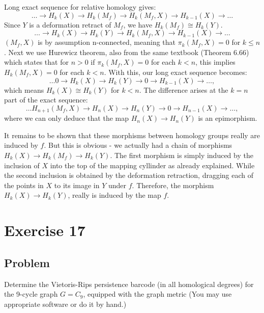 \documentclass{article}
\begin{document}
\noindent
Long exact sequence for relative homology gives:
\begin{equation*}
\dots \to H_k(X) \to H_k(M_f) \to H_k(M_f,X) \to H_{k-1}(X) \to \dots
\end{equation*}
Since $Y$ is a deformation retract of $M_f$, we have $H_k(M_f) \cong H_k(Y)$.
\begin{equation*}
\dots \to H_k(X) \to H_k(Y) \to H_k(M_f,X) \to H_{k-1}(X) \to \dots
\end{equation*}
$(M_f,X)$ is by assumption n-connected, meaning that $\pi_k(M_f,X) = 0$ for $k \leq n$.
Next we use Hurewicz theorem, also from the same textbook (Theorem 6.66) which states that for $n>0$ if  $\pi_k(M_f,X) = 0$ for each $k<n$, this implies $H_k(M_f,X) = 0$ for each $k<n$. With this, our long exact sequence becomes:
\begin{equation*}
\dots 0 \to H_k(X) \to H_k(Y) \to 0 \to H_{k-1}(X) \to \dots,
\end{equation*}
which means $H_k(X) \cong H_k(Y)$ for $k<n$. The difference arises at the $k=n$ part of the exact sequence:
\begin{equation*}
\dots H_{n+1}(M_f,X) \to H_n(X) \to H_n(Y) \to 0 \to H_{n-1}(X) \to \dots,
\end{equation*}
where we can only deduce that the map $H_n(X) \to H_n(Y)$ is an epimorphism.

It remains to be shown that these morphisms between homology groups really are induced by $f$. But this is obvious - we actually had a chain of morphisms $H_k(X) \to H_k(M_f) \to H_k(Y)$. The first morphism is simply induced by the inclusion of $X$ into the top of the mapping cyllinder as already explained. While the second inclusion is obtained by the deformation retraction, dragging each of the points in $X$ to its image in $Y$ under $f$. Therefore, the morphism $H_k(X) \to H_k(Y)$, really is induced by the map $f$.
\newpage
\section*{Exercise 17}
\subsection*{Problem}
Determine the Vietoris-Rips persistence barcode (in all homological degrees) for the
9-cycle graph $G=C_9$, equipped with the graph metric (You may use appropriate software or do it by hand.)
\end{document}

